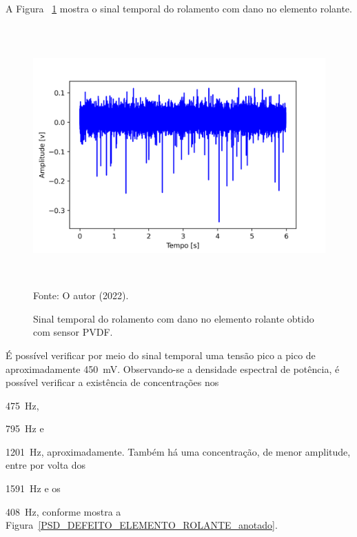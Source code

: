 \documentclass[
	12pt,				
	oneside,			
	a4paper,			
	english,			
	brazil,	
	sumario=abnt-6027-2012		
	]{abntex2ppgsi}
\begin{document}
{{{{{{{{{{{{{{{{A Figura ~\ref{DEFEITO_ELEMENTO_ROLANTE} mostra o sinal temporal do rolamento com dano no elemento rolante. 

\begin{figure}[H]
\centering
\caption {Sinal temporal do rolamento com dano no elemento rolante obtido com sensor PVDF.}
\includegraphics[width=\textwidth,height=100mm,keepaspectratio]{aquisicao_06_dano_rolante_11_03_2022_13h48min_2560samples_ajustado_impactos_6s} \\
Fonte: O autor (2022).
\label{DEFEITO_ELEMENTO_ROLANTE}
\end{figure} 

É possível verificar por meio do sinal temporal uma tensão pico a pico de aproximadamente {\SI{450}{\milli\volt}}. Observando-se a densidade espectral de potência, é possível verificar a existência de concentrações nos {\SI{475}{\hertz}, {\SI{795}{\hertz} e {\SI{1201}{\hertz}, aproximadamente. Também há uma concentração, de menor amplitude, entre por volta dos {\SI{1591}{\hertz} e os {\SI{408}{\hertz}, conforme mostra a Figura~\ref{PSD_DEFEITO_ELEMENTO_ROLANTE_anotado}. 

}}}}}}}}}}}}}}}}}}}}}
\end{document}
